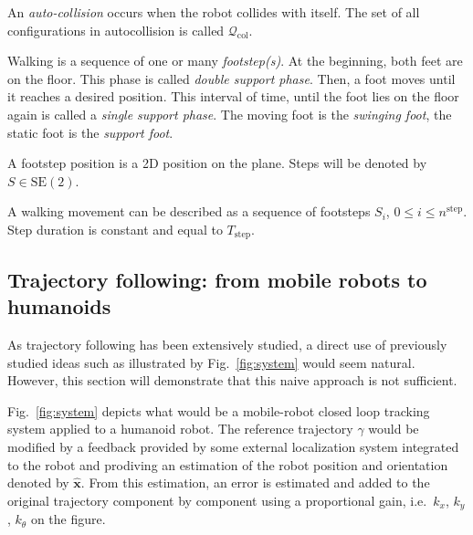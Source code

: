 An \emph{auto-collision} occurs when the robot collides with
itself. The set of all configurations in autocollision is called
\mbox{$\mathcal{Q}_{\text{col}}$}.

Walking is a sequence of one or many \emph{footstep(s)}. At the beginning,
both feet are on the floor. This phase is called \emph{double support
  phase}. Then, a foot moves until it reaches a desired position. This
interval of time, until the foot lies on the floor again is called a
\emph{single support phase}. The moving foot is the \emph{swinging
  foot}, the static foot is the \emph{support foot}.

A footstep position is a 2D position on the plane. Steps will be
denoted by \mbox{$S \in \text{SE}(2)$}.

A walking movement can be described as a sequence of footsteps $S_i$,
\mbox{$0 \leq i \leq n^{\text{step}}$}. Step duration is constant and equal
to $T_{\text{step}}$.


\subsection{Trajectory following: from mobile robots to humanoids}


As trajectory following has been extensively studied, a direct use of
previously studied ideas such as illustrated by Fig.~\ref{fig:system}
would seem natural. However, this section will demonstrate that this
naive approach is not sufficient.


Fig.~\ref{fig:system} depicts what would be a mobile-robot closed
loop tracking system applied to a humanoid robot. The reference
trajectory $\gamma$ would be modified by a feedback provided by some
external localization system integrated to the robot and prodiving an
estimation of the robot position and orientation denoted by
$\hat{\mathbf{x}}$. From this estimation, an error is estimated and
added to the original trajectory component by component using a
proportional gain, i.e.\ $k_x$, $k_y$, $k_{\theta}$ on the figure.


